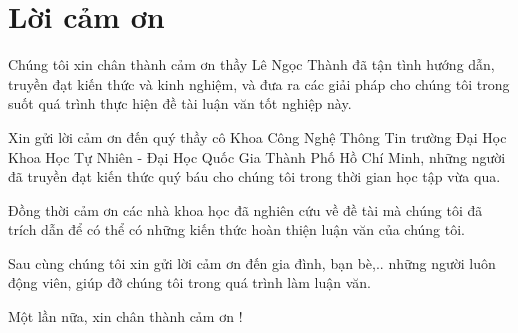 \chapter*{Lời cảm ơn}
\label{chap:thanks}


Chúng tôi xin chân thành cảm ơn thầy Lê Ngọc Thành đã tận tình hướng dẫn, truyền đạt kiến thức và kinh nghiệm, và đưa ra các giải pháp cho chúng tôi trong suốt quá trình thực hiện đề tài luận văn tốt nghiệp này.

Xin gửi lời cảm ơn đến quý thầy cô Khoa Công Nghệ Thông Tin trường Đại Học Khoa Học Tự Nhiên - Đại Học Quốc Gia Thành Phố Hồ Chí Minh, những người đã truyền đạt kiến thức quý báu cho chúng tôi trong thời gian học tập vừa qua.

Đồng thời cảm ơn các nhà khoa học đã nghiên cứu về đề tài mà chúng tôi đã trích dẫn để có thể có những kiến thức hoàn thiện luận văn của chúng tôi.

Sau cùng chúng tôi xin gửi lời cảm ơn đến gia đình, bạn bè,.. những người luôn động viên, giúp đỡ chúng tôi trong quá trình làm luận văn. 

Một lần nữa, xin chân thành cảm ơn !